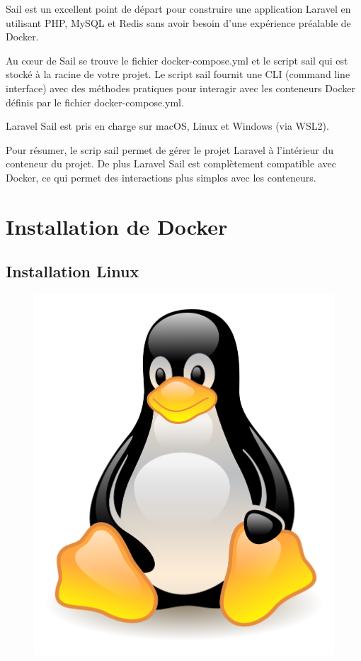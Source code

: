\documentclass[internal]{nhitec_design}
\begin{document}
        Sail est un excellent point de départ pour construire une application Laravel en utilisant PHP, MySQL et Redis sans avoir besoin d'une expérience préalable de Docker.

        Au cœur de Sail se trouve le fichier docker-compose.yml et le script sail qui est stocké à la racine de votre projet. Le script sail fournit une CLI (command line interface) avec des méthodes pratiques pour interagir avec les conteneurs Docker définis par le fichier docker-compose.yml.

        Laravel Sail est pris en charge sur macOS, Linux et Windows (via WSL2).

        Pour résumer, le scrip sail permet de gérer le projet Laravel à l'intérieur du conteneur du projet. De plus Laravel Sail est complètement compatible avec Docker, ce qui permet des interactions plus simples avec les conteneurs.

\section{Installation de Docker}
    \subsection{Installation Linux}

        \begin{figure}[h]
            \centering
            \includegraphics[scale=0.05]{Images_formation/LinuxLogo.png}
        \end{figure}
\end{document}
